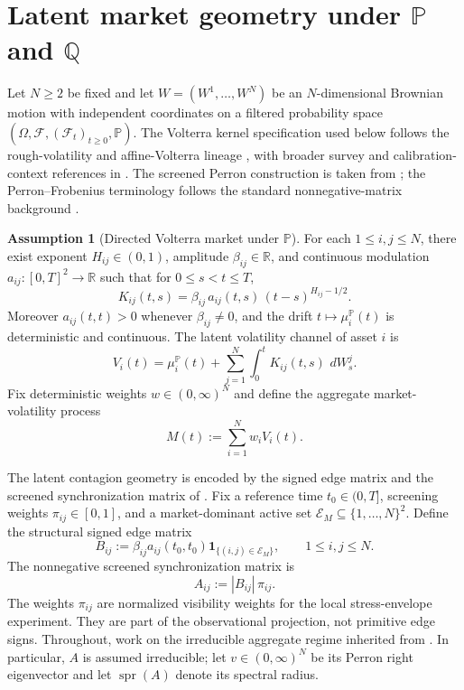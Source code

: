 \documentclass[11pt,a4paper]{amsart}
\theoremstyle{plain}
\theoremstyle{definition}
\newtheorem{assumption}[theorem]{Assumption}
\theoremstyle{remark}
\DeclareMathOperator{\spr}{spr}
\newcommand{\R}{\mathbb{R}}
\newcommand{\PP}{\mathbb{P}}
\newcommand{\QQ}{\mathbb{Q}}
\newcommand{\cF}{\mathcal{F}}
\newcommand{\cE}{\mathcal{E}}
\newcommand{\one}{\mathbf{1}}
\newcommand{\dd}{\,d}
\begin{document}
\section{Latent market geometry under \texorpdfstring{\(\PP\)}{P} and \texorpdfstring{\(\QQ\)}{Q}}\label{sec:model}

Let \(N\ge2\) be fixed and let \(W=(W^1,\dots,W^N)\) be an \(N\)-dimensional Brownian motion with
independent coordinates on a filtered probability space
\((\Omega,\cF,(\cF_t)_{t\ge0},\PP)\).
The Volterra kernel specification used below follows the rough-volatility and affine-Volterra
lineage \cite{bayer2016pricing,gatheral2018volatility,abijaber2019affine,eleuch2019roughheston},
with broader survey and calibration-context references in
\cite{dinunno2023survey,abijaberLi2025practice}.  The screened Perron construction is taken
from \cite{vidal2026market}; the Perron--Frobenius terminology follows the standard
nonnegative-matrix background \cite{hornJohnson2012,bermanPlemmons1994}.

\begin{assumption}[Directed Volterra market under \(\PP\)]\label{ass:model}
For each \(1\le i,j\le N\), there exist exponent \(H_{ij}\in(0,1)\), amplitude
\(\beta_{ij}\in\R\), and continuous modulation \(a_{ij}\colon [0,T]^2\to\R\) such that for
\(0\le s<t\le T\),
\[
        K_{ij}(t,s)
        =
        \beta_{ij}\,a_{ij}(t,s)\,(t-s)^{H_{ij}-1/2}.
\]
Moreover \(a_{ij}(t,t)>0\) whenever \(\beta_{ij}\neq0\), and the drift \(t\mapsto \mu_i^\PP(t)\)
is deterministic and continuous.  The latent volatility channel of asset \(i\) is
\[
        V_i(t)
        =
        \mu_i^\PP(t)
        +
        \sum_{j=1}^N \int_0^t K_{ij}(t,s)\,\dd W_s^j.
\]
Fix deterministic weights \(w\in(0,\infty)^N\) and define the aggregate market-volatility process
\[
        M(t):=\sum_{i=1}^N w_i V_i(t).
\]
\end{assumption}

The latent contagion geometry is encoded by the signed edge matrix and the screened
synchronization matrix of \cite{vidal2026market}.  Fix a reference time
\(t_0\in(0,T]\), screening weights \(\pi_{ij}\in[0,1]\), and a market-dominant active set
\(\cE_M\subseteq\{1,\dots,N\}^2\).  Define the structural signed edge matrix
\[
        B_{ij}
        :=
        \beta_{ij}a_{ij}(t_0,t_0)\one_{\{(i,j)\in \cE_M\}},
        \qquad
        1\le i,j\le N.
\]
The nonnegative screened synchronization matrix is
\[
        A_{ij}:=|B_{ij}|\,\pi_{ij}.
\]
The weights \(\pi_{ij}\) are normalized visibility weights for the local stress-envelope
experiment.  They are part of the observational projection, not primitive edge signs.
Throughout, work on the irreducible aggregate regime inherited from
\cite{vidal2026market}.  In particular, \(A\) is assumed irreducible; let
\(v\in(0,\infty)^N\) be its Perron right eigenvector and let \(\spr(A)\) denote its spectral
radius.
\end{document}
